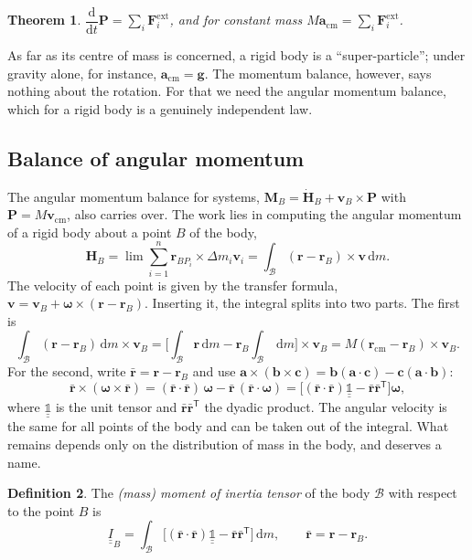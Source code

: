 \documentclass[11pt,a4paper,oneside]{report}
\numberwithin{equation}{chapter}
\newcommand{\vect}[1]{\bm{#1}}
\newcommand{\tens}[1]{\underline{\underline{#1}}}
\newcommand{\dd}{\,\mathrm{d}}
\newcommand{\Id}{\tens{\mathbb{1}}}
\newcommand{\cm}{\mathrm{cm}}
\newcommand{\ext}{\mathrm{ext}}
\theoremstyle{plain}
\newtheorem{theorem}{Theorem}[chapter]
\theoremstyle{definition}
\newtheorem{definition}[theorem]{Definition}
\theoremstyle{remark}
\newcommand{\lecture}[2]{\marginpar{\raggedright\footnotesize\textsc{Lecture #1}\\\textit{#2}}}
\begin{document}
\begin{theorem}
$\dfrac{\mathrm d}{\mathrm dt}\vect P=\sum_i\vect F_i^{\ext}$, and for constant mass $M\vect a_\cm=\sum_i\vect F_i^{\ext}$.
\end{theorem}
As far as its centre of mass is concerned, a rigid body is a ``super-particle''; under gravity alone, for instance,
$\vect a_\cm=\vect g$. The momentum balance, however, says nothing about the rotation. For that we need the angular
momentum balance, which for a rigid body is a genuinely independent law.

\subsection{Balance of angular momentum}
\lecture{10}{19.10.2026}
The angular momentum balance for systems, $\vect M_B=\dot{\vect H}_B+\vect v_B\times\vect P$ with $\vect P=M\vect v_\cm$,
also carries over. The work lies in computing the angular momentum of a rigid body about a point $B$ of the body,
\[
  \vect H_B=\lim\sum_{i=1}^n\vect r_{BP_i}\times\Delta m_i\vect v_i=\int_{\mathcal B}(\vect r-\vect r_B)\times\vect v\dd m .
\]
The velocity of each point is given by the transfer formula, $\vect v=\vect v_B+\vect\omega\times(\vect r-\vect r_B)$. Inserting
it, the integral splits into two parts. The first is
\[
  \int_{\mathcal B}(\vect r-\vect r_B)\dd m\times\vect v_B=\Big[\int_{\mathcal B}\vect r\dd m-\vect r_B\int_{\mathcal B}\dd m\Big]\times\vect v_B
  =M(\vect r_\cm-\vect r_B)\times\vect v_B .
\]
For the second, write $\bar{\vect r}=\vect r-\vect r_B$ and use $\vect a\times(\vect b\times\vect c)=\vect b(\vect a\cdot\vect c)-\vect c(\vect a\cdot\vect b)$:
\[
  \bar{\vect r}\times(\vect\omega\times\bar{\vect r})=(\bar{\vect r}\cdot\bar{\vect r})\,\vect\omega-\bar{\vect r}\,(\bar{\vect r}\cdot\vect\omega)
  =\big[(\bar{\vect r}\cdot\bar{\vect r})\Id-\bar{\vect r}\bar{\vect r}^{\mathsf T}\big]\vect\omega ,
\]
where $\Id$ is the unit tensor and $\bar{\vect r}\bar{\vect r}^{\mathsf T}$ the dyadic product. The angular velocity is the
same for all points of the body and can be taken out of the integral. What remains depends only on the distribution of
mass in the body, and deserves a name.

\begin{definition}
The \emph{(mass) moment of inertia tensor} of the body $\mathcal B$ with respect to the point $B$ is
\begin{equation}
  \tens I_B=\int_{\mathcal B}\big[(\bar{\vect r}\cdot\bar{\vect r})\Id-\bar{\vect r}\bar{\vect r}^{\mathsf T}\big]\dd m,
  \qquad\bar{\vect r}=\vect r-\vect r_B .
\end{equation}
\end{definition}
\end{document}
